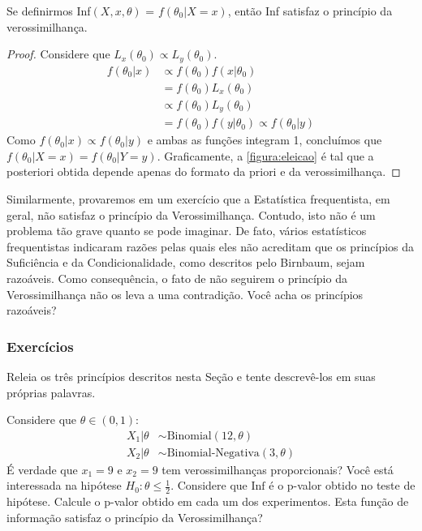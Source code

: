 \begin{lemma}
 Se definirmos Inf$(X,x,\theta)$ 
 = $f(\theta_{0}|X=x)$, então 
 Inf satisfaz o princípio da verossimilhança.
\end{lemma}

\begin{proof}
 Considere que 
 $L_{x}(\theta_{0}) \propto L_{y}(\theta_{0})$.
 \begin{align*}
  f(\theta_{0}|x)
  &\propto f(\theta_{0})f(x|\theta_{0}) \\
  &= f(\theta_{0})L_{x}(\theta_{0}) \\
  & \propto f(\theta_{0})L_{y}(\theta_{0}) \\
  &= f(\theta_{0})f(y|\theta_{0})
  \propto f(\theta_{0}|y)
 \end{align*}
 Como $f(\theta_{0}|x) \propto f(\theta_{0}|y)$ e
 ambas as funções integram 1, concluímos que
 $f(\theta_{0}|X=x) = f(\theta_{0}|Y=y)$.
 Graficamente, a \cref{figura:eleicao} é tal que
 a posteriori obtida depende apenas do 
 formato da priori e da verossimilhança.
\end{proof}

Similarmente, provaremos em um exercício que
a Estatística frequentista, em geral, 
não satisfaz o princípio da Verossimilhança.
Contudo, isto não é um problema tão grave quanto
se pode imaginar. De fato, vários 
estatísticos frequentistas indicaram razões 
pelas quais eles não acreditam que 
os princípios da Suficiência e da Condicionalidade,
como descritos pelo Birnbaum, sejam razoáveis.
Como consequência, o fato de não seguirem 
o princípio da Verossimilhança não 
os leva a uma contradição. 
Você acha os princípios razoáveis?
 
\subsubsection*{Exercícios}

\begin{exercise}
 Releia os três princípios descritos nesta Seção e
 tente descrevê-los em suas próprias palavras.
\end{exercise}

\begin{exercise}
 Considere que $\theta \in (0,1)$:
 \begin{align*}
  X_{1}|\theta 
  &\sim \text{Binomial}(12, \theta) \\
  X_{2}|\theta 
  &\sim \text{Binomial-Negativa}(3, \theta)
 \end{align*}
 É verdade que $x_{1}=9$ e $x_{2}=9$ tem 
 verossimilhanças proporcionais?
 Você está interessada na hipótese 
 $H_{0}: \theta \leq \frac{1}{2}$.
 Considere que $\text{Inf}$ é o p-valor obtido 
 no teste de hipótese.
 Calcule o p-valor obtido em cada um 
 dos experimentos.
 Esta função de informação satisfaz 
 o princípio da Verossimilhança?
\end{exercise}

